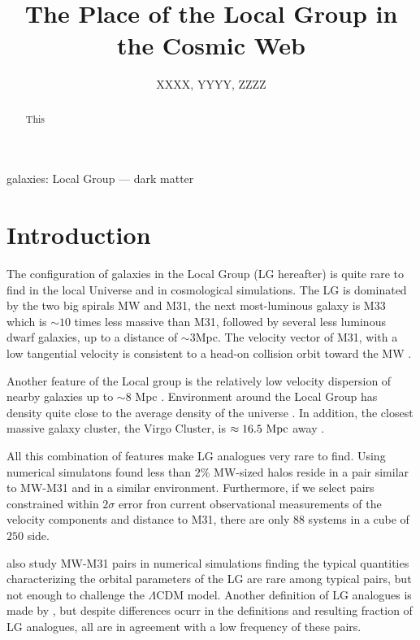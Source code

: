 \documentclass{emulateapj}
\newcommand{\lcdm}{$\Lambda$CDM }
\newcommand{\mpc}{\rm{Mpc}}
\newcommand{\hmpc}{{\ifmmode{h^{-1}{\rm Mpc}}\else{$h^{-1}$Mpc }\fi}}
\begin{document}
\title{The Place of the Local Group in the Cosmic Web} 
\author{
  XXXX,
  YYYY,
  ZZZZ
}

\begin{abstract}
This
\end{abstract}

\begin{keywords}
{galaxies: Local Group --- dark matter}
\end{keywords}


\section{Introduction}
\label{sec:intro}

The configuration of galaxies in the Local Group (LG hereafter) is quite rare to find in the local Universe and in cosmological simulations. 
The LG is dominated by the two big spirals MW and M31, the next most-luminous galaxy is M33 which is $\sim 10$ times less massive than M31, followed by several less luminous dwarf galaxies, up to a distance of $\sim 3$\mpc.
The velocity vector of M31, with a low tangential velocity is
consistent to a head-on collision orbit toward the MW
\citep{2008MNRAS.386..461C,2012ApJ...753....8V,2012ApJ...753....7S}. 

Another feature of the Local group is the relatively low velocity
dispersion of nearby galaxies up to $\sim 8$ Mpc \citep[][and
  references therein]{1975ApJ...196..313S,2011MNRAS.415L..16A}. 
Environment around the Local Group has density quite close to the
average density of the universe
\citep{2003ApJ...596...19K,2005AJ....129..178K}. In addition, the
closest massive galaxy cluster, the Virgo Cluster, is $\approx
16.5\ \mpc$ away \citep{2007ApJ...655..144M}. 

All this combination of features make LG analogues very rare to
find. Using numerical simulatons \citet{lganalogues} found less than
$2\%$ MW-sized halos reside in a pair similar to MW-M31 and in a
similar environment. Furthermore, if we select pairs constrained
within $2\sigma$ error fron current observational measurements of the
velocity components and distance to M31, there are only $88$ systems
in a cube of $250$ \hmpc side. 

\citet{2013ApJ...767L...5F} also study MW-M31 pairs in numerical
simulations finding the typical quantities characterizing the orbital
parameters of the LG are rare among typical pairs, but not enough to
challenge the \lcdm model. 
Another definition of LG analogues is made by
\citet{2008MNRAS.384.1459L}, but despite differences ocurr in the
definitions and resulting fraction of LG analogues, all are in
agreement with a low frequency of these pairs. 
\end{document}
